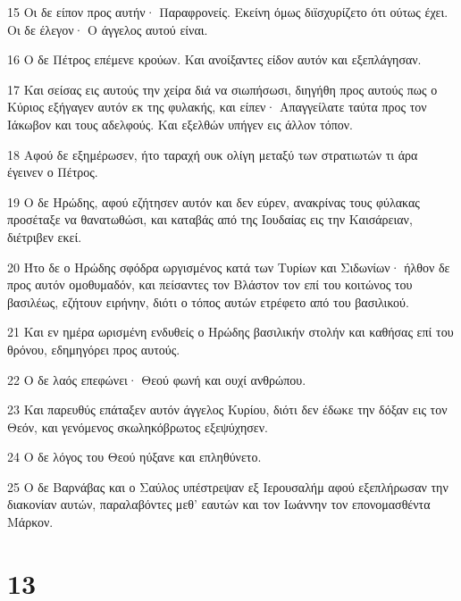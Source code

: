 \par 15 Οι δε είπον προς αυτήν· Παραφρονείς. Εκείνη όμως διϊσχυρίζετο ότι ούτως έχει. Οι δε έλεγον· Ο άγγελος αυτού είναι.
\par 16 Ο δε Πέτρος επέμενε κρούων. Και ανοίξαντες είδον αυτόν και εξεπλάγησαν.
\par 17 Και σείσας εις αυτούς την χείρα διά να σιωπήσωσι, διηγήθη προς αυτούς πως ο Κύριος εξήγαγεν αυτόν εκ της φυλακής, και είπεν· Απαγγείλατε ταύτα προς τον Ιάκωβον και τους αδελφούς. Και εξελθών υπήγεν εις άλλον τόπον.
\par 18 Αφού δε εξημέρωσεν, ήτο ταραχή ουκ ολίγη μεταξύ των στρατιωτών τι άρα έγεινεν ο Πέτρος.
\par 19 Ο δε Ηρώδης, αφού εζήτησεν αυτόν και δεν εύρεν, ανακρίνας τους φύλακας προσέταξε να θανατωθώσι, και καταβάς από της Ιουδαίας εις την Καισάρειαν, διέτριβεν εκεί.
\par 20 Ήτο δε ο Ηρώδης σφόδρα ωργισμένος κατά των Τυρίων και Σιδωνίων· ήλθον δε προς αυτόν ομοθυμαδόν, και πείσαντες τον Βλάστον τον επί του κοιτώνος του βασιλέως, εζήτουν ειρήνην, διότι ο τόπος αυτών ετρέφετο από του βασιλικού.
\par 21 Και εν ημέρα ωρισμένη ενδυθείς ο Ηρώδης βασιλικήν στολήν και καθήσας επί του θρόνου, εδημηγόρει προς αυτούς.
\par 22 Ο δε λαός επεφώνει· Θεού φωνή και ουχί ανθρώπου.
\par 23 Και παρευθύς επάταξεν αυτόν άγγελος Κυρίου, διότι δεν έδωκε την δόξαν εις τον Θεόν, και γενόμενος σκωληκόβρωτος εξεψύχησεν.
\par 24 Ο δε λόγος του Θεού ηύξανε και επληθύνετο.
\par 25 Ο δε Βαρνάβας και ο Σαύλος υπέστρεψαν εξ Ιερουσαλήμ αφού εξεπλήρωσαν την διακονίαν αυτών, παραλαβόντες μεθ' εαυτών και τον Ιωάννην τον επονομασθέντα Μάρκον.

\chapter{13}

